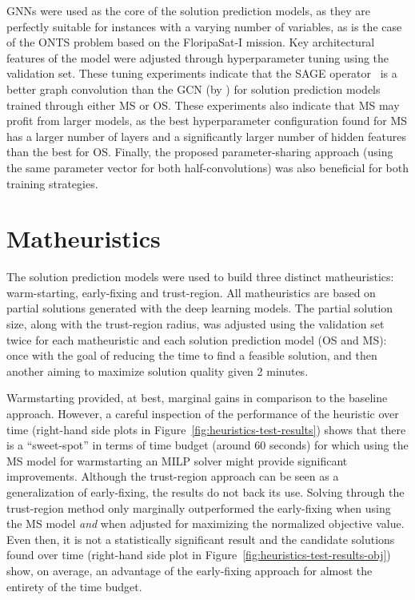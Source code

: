 GNNs were used as the core of the solution prediction models, as they are perfectly suitable for instances with a varying number of variables, as is the case of the ONTS problem based on the FloripaSat-I mission.
Key architectural features of the model were adjusted through hyperparameter tuning using the validation set.
These tuning experiments indicate that the SAGE operator~\cite{hamiltonInductiveRepresentationLearning2017} is a better graph convolution than the GCN (by ) for solution prediction models trained through either MS or OS.
These experiments also indicate that MS may profit from larger models, as the best hyperparameter configuration found for MS has a larger number of layers and a significantly larger number of hidden features than the best for OS.
Finally, the proposed parameter-sharing approach (using the same parameter vector for both half-convolutions) was also beneficial for both training strategies. 

\section{Matheuristics}

The solution prediction models were used to build three distinct matheuristics: warm-starting, early-fixing and trust-region.
All matheuristics are based on partial solutions generated with the deep learning models.
The partial solution size, along with the trust-region radius, was adjusted using the validation set twice for each matheuristic and each solution prediction model (OS and MS): once with the goal of reducing the time to find a feasible solution, and then another aiming to maximize solution quality given 2 minutes.

Warmstarting provided, at best, marginal gains in comparison to the baseline approach.
However, a careful inspection of the performance of the heuristic over time (right-hand side plots in Figure~\ref{fig:heuristics-test-results}) shows that there is a ``sweet-spot'' in terms of time budget (around 60 seconds) for which using the MS model for warmstarting an MILP solver might provide significant improvements.
Although the trust-region approach can be seen as a generalization of early-fixing, the results do not back its use.
Solving through the trust-region method only marginally outperformed the early-fixing when using the MS model \emph{and} when adjusted for maximizing the normalized objective value.
Even then, it is not a statistically significant result and the candidate solutions found over time (right-hand side plot in Figure~\ref{fig:heuristics-test-results-obj}) show, on average, an advantage of the early-fixing approach for almost the entirety of the time budget.

